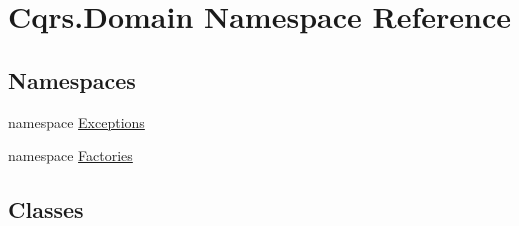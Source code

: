 \hypertarget{namespaceCqrs_1_1Domain}{}\section{Cqrs.\+Domain Namespace Reference}
\label{namespaceCqrs_1_1Domain}
\subsection*{Namespaces}
\begin{DoxyCompactItemize}
\item 
namespace \hyperlink{namespaceCqrs_1_1Domain_1_1Exceptions}{Exceptions}
\item 
namespace \hyperlink{namespaceCqrs_1_1Domain_1_1Factories}{Factories}
\end{DoxyCompactItemize}
\subsection*{Classes}
